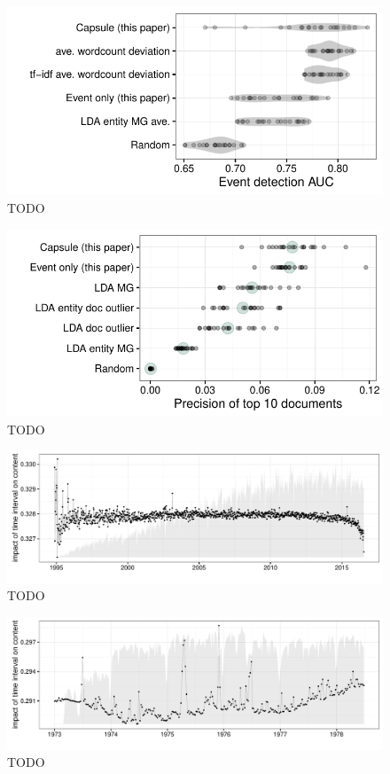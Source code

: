 \begin{figure}
\centering
\includegraphics[width=\linewidth]{fig/sim_eventdetect.pdf}
\caption{TODO}
\label{fig:sim_eventdetect}
\end{figure}

\begin{figure}
\centering
\includegraphics[width=\linewidth]{fig/precision10.pdf}
\caption{TODO}
\label{fig:sim_precision}
\end{figure}

\begin{figure}
\centering
\includegraphics[width=\linewidth]{fig/arxiv_events.pdf}
\caption{TODO}
\label{fig:arxiv_events}
\end{figure}

\begin{figure}
\centering
\includegraphics[width=\linewidth]{fig/cables_events.pdf}
\caption{TODO}
\label{fig:cables_events}
\end{figure}

